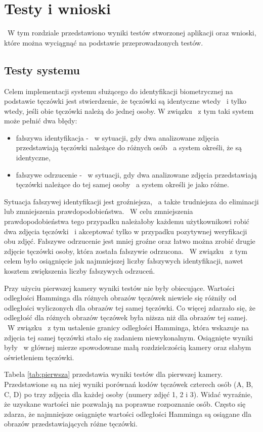 \chapter{Testy i wnioski}
\label{cha:testywnioski}
~W tym rozdziale przedstawiono wyniki testów stworzonej aplikacji oraz wnioski, które można wyciągnąć na podstawie przeprowadzonych testów.

\section{Testy systemu}
\label{sec:testy}
Celem implementacji systemu służącego do identyfikacji biometrycznej na podstawie tęczówki jest stwierdzenie, że tęczówki są identyczne wtedy ~i tylko wtedy, jeśli obie tęczówki należą do jednej osoby. W związku ~z tym taki system może pełnić dwa błędy:
\begin{itemize}
\item fałszywa identyfikacja - ~w sytuacji, gdy dwa analizowane zdjęcia przedstawiają tęczówki należące do różnych osób ~a system określi, że są identyczne,
\item fałszywe odrzucenie - ~w sytuacji, gdy dwa analizowane zdjęcia przedstawiają tęczówki należące do tej samej osoby ~a system określi je jako różne.
\end{itemize}
Sytuacja fałszywej identyfikacji jest groźniejsza, ~a także trudniejsza do eliminacji lub zmniejszenia prawdopodobieństwa. ~W celu zmniejszenia prawdopodobieństwa tego przypadku należałoby każdemu użytkownikowi robić dwa zdjęcia tęczówki ~i akceptować tylko w przypadku pozytywnej weryfikacji obu zdjęć. Fałszywe odrzucenie jest mniej groźne oraz łatwo można zrobić drugie zdjęcie tęczówki osoby, która została fałszywie odrzucona. ~W związku ~z tym celem było osiągnięcie jak najmniejszej liczby fałszywych identyfikacji, nawet kosztem zwiększenia liczby fałszywych odrzuceń.

Przy użyciu pierwszej kamery wyniki testów nie były obiecujące. Wartości odległości Hamminga dla różnych obrazów tęczówek niewiele się różniły od odległości wyliczonych dla obrazów tej samej tęczówki. Co więcej zdarzało się, że odległość dla różnych obrazów tęczówek była niższa niż dla obrazów tej samej. ~W związku ~z tym ustalenie granicy odległości Hamminga, która wskazuje na zdjęcia tej samej tęczówki stało się zadaniem niewykonalnym. Osiągnięte wyniki były ~w głównej mierze spowodowane małą rozdzielczością kamery oraz słabym oświetleniem tęczówki.

Tabela \ref{tab:pierwsza} przedstawia wyniki testów dla pierwszej kamery. Przedstawione są na niej wyniki porównań kodów tęczówek czterech osób (A, B, C, D) po trzy zdjęcia dla każdej osoby (numery zdjęć 1, 2 i 3). Widać wyraźnie, że uzyskane wartości nie pozwalają na poprawne rozpoznanie osób. Często się zdarza, że najmniejsze osiągnięte wartości odległości Hamminga są osiągane dla obrazów przedstawiających różne tęczówki.

